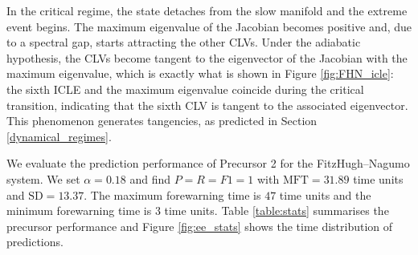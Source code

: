 \documentclass[aps,reprint,prx]{revtex4-2}
\begin{document}
{In the critical regime, the state detaches from the slow manifold and the extreme event begins. The maximum eigenvalue of the Jacobian becomes positive and, due to a spectral gap, starts attracting the other CLVs. Under the adiabatic hypothesis, the CLVs become tangent to the eigenvector of the Jacobian with the maximum eigenvalue, which is exactly what is shown in Figure \ref{fig:FHN_icle}: the sixth ICLE and the maximum eigenvalue coincide during the critical transition, indicating that the sixth CLV is tangent to the associated eigenvector. This phenomenon generates tangencies, as predicted in Section \ref{dynamical_regimes}.}

{We evaluate the prediction performance of Precursor 2 for the FitzHugh--Nagumo system. We set $\alpha = 0.18$ and find $P = R = F1 = 1$ with $\text{MFT} = 31.89$ time units and $\text{SD}=13.37$. The maximum forewarning time is $47$ time units and the minimum forewarning time is $3$ time units. Table \ref{table:stats} summarises the precursor performance and Figure \ref{fig:ee_stats} shows the time distribution of predictions.}
\end{document}
